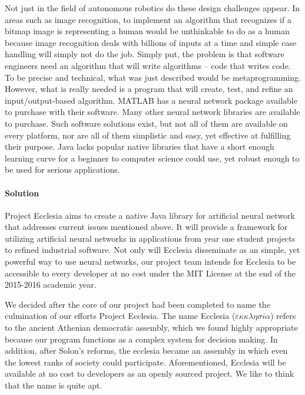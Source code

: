 \documentclass[letterpaper, 10pt]{article}
\begin{document}
	Not just in the field of autonomous robotics do these design challenges appear. In areas such as image recognition, to implement an algorithm that recognizes if a bitmap image is representing a human would be unthinkable to do as a human because image recognition deals with billions of inputs at a time and simple case handling will simply not do the job. Simply put, the problem is that software engineers need an algorithm that will write algorithms -- code that writes code. To be precise and technical, what was just described would be metaprogramming. However, what is really needed is a program that will create, test, and refine an input/output-based algorithm. MATLAB has a neural network package available to purchase with their software. Many other neural network libraries are available to purchase. Such software solutions exist, but not all of them are available on every platform, nor are all of them simplistic and easy, yet effective at fulfilling their purpose. Java lacks popular native libraries that have a short enough learning curve for a beginner to computer science could use, yet robust enough to be used for serious applications.
	\paragraph{Solution} Project Ecclesia aims to create a native Java library for artificial neural network that addresses current issues mentioned above. It will provide a framework for utilizing artificial neural networks in applications from year one student projects to refined industrial software. Not only will Ecclesia disseminate as an simple, yet powerful way to use neural networks, our project team intends for Ecclesia to be accessible to every developer at no cost under the MIT License at the end of the 2015-2016 academic year.
	
	We decided after the core of our project had been completed to name the culmination of our efforts Project Ecclesia. The name Ecclesia ($\varepsilon \kappa \kappa \lambda \eta \sigma i \alpha$) refers to the ancient Athenian democratic assembly, which we found highly appropriate because our program functions as a complex system for decision making. In addition, after Solon's reforms, the ecclesia became an assembly in which even the lowest ranks of society could participate. Aforementioned, Ecclesia will be available at no cost to developers as an openly sourced project. We like to think that the name is quite apt.
\clearpage
\end{document}
